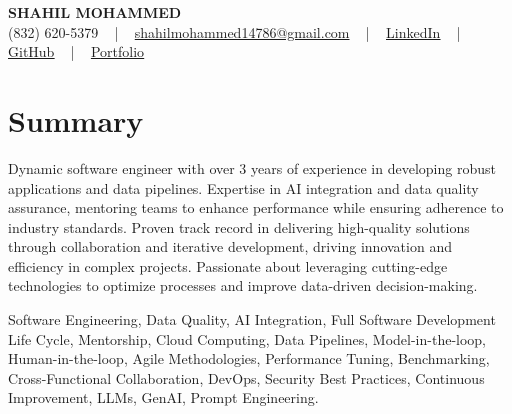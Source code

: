 \documentclass[letterpaper,10pt]{article}
\begin{document}
\begin{center}
    {\fontsize{14pt}{12pt}\selectfont \textbf{\MakeUppercase{Shahil Mohammed}}}\\ \vspace{2pt}
    \fontsize{10pt}{12pt}\selectfont (832) 620-5379 ~ | ~ \href{mailto:shahilmohammed14786@gmail.com}{shahilmohammed14786@gmail.com} ~ | ~  
    \href{https://www.linkedin.com/in/shahil-mohammed-9652931a1/}{\color{blue}\underline{LinkedIn}}  ~ | ~ 
    \href{https://github.com/freakbeast14}{\color{blue}\underline{GitHub}} ~ | ~ 
    \href{https://shahil-mohammed.netlify.app/}{\color{blue}\underline{Portfolio}}
    \vspace{-8pt}
\end{center}

\section{Summary}
\vspace{-2pt}\fontsize{8pt}{9pt}\selectfont
Dynamic software engineer with over 3 years of experience in developing robust applications and data pipelines. Expertise in AI integration and data quality assurance, mentoring teams to enhance performance while ensuring adherence to industry standards. Proven track record in delivering high-quality solutions through collaboration and iterative development, driving innovation and efficiency in complex projects. Passionate about leveraging cutting-edge technologies to optimize processes and improve data-driven decision-making.
 \vspace{-5pt}
 
{\fontsize{1pt}{1pt}\selectfont\color{white}
Software Engineering, Data Quality, AI Integration, Full Software Development Life Cycle, Mentorship, Cloud Computing, Data Pipelines, Model-in-the-loop, Human-in-the-loop, Agile Methodologies, Performance Tuning, Benchmarking, Cross-Functional Collaboration, DevOps, Security Best Practices, Continuous Improvement, LLMs, GenAI, Prompt Engineering.
}
\vspace{-8pt}

\vspace{-2pt}
\end{document}
